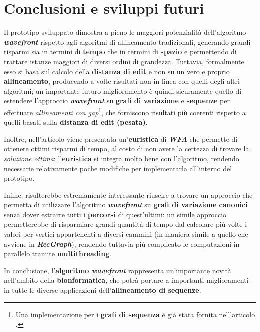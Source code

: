 \chapter{Conclusioni e sviluppi futuri}
    Il prototipo sviluppato dimostra a pieno le maggiori potenzialità dell'algoritmo \textbf{\textit{wavefront}} rispetto agli algoritmi di allineamento tradizionali, generando grandi risparmi sia in termini di \textbf{tempo} che in termini di \textbf{spazio} e permettendo di trattare istanze maggiori di diversi ordini di grandezza. Tuttavia, formalmente esso si basa sul calcolo della \textbf{distanza di edit} e non su un vero e proprio \textbf{allineamento}, producendo a volte risultati non in linea con quelli degli altri algoritmi; un importante futuro miglioramento è quindi sicuramente quello di estendere l'approccio \textbf{\textit{wavefront}} su \textbf{grafi di variazione} e \textbf{sequenze} per effettuare \emph{allineamenti con gap}\footnote{Una implementazione per i \textbf{grafi di sequenza} è già stata fornita nell'articolo \cite{wfa_gap_penalty}.}, che forniscono risultati più coerenti rispetto a quelli basati sulla \textbf{distanza di edit (pesata)}.   
    
    \vspace{10pt}
    Inoltre, nell'articolo \cite{wfa_sequence_graph} viene presentata un'\textbf{euristica} di \textbf{\textit{WFA}} che permette di ottenere ottimi risparmi di tempo, al costo di non avere la certezza di trovare la \emph{soluzione ottima}: l'\textbf{euristica} si integra molto bene con l'algoritmo, rendendo necessarie relativamente poche modifiche per implementarla all'interno del prototipo.
    
    \vspace{10pt}
    Infine, risulterebbe estremamente interessante riuscire a trovare un approccio che permetta di utilizzare l'algoritmo \textbf{\textit{wavefront}} su \textbf{grafi di variazione canonici} senza dover estrarre tutti i \textbf{percorsi} di quest'ultimi: un simile approccio permetterebbe di risparmiare grandi quantità di tempo dal calcolare più volte i valori per vertici appartenenti a diversi cammini (in maniera simile a quello che avviene in \textbf{\textit{RecGraph}}), rendendo tuttavia più complicato le computazioni in parallelo tramite \textbf{multithreading}.

    \vspace{10pt}
    In conclusione, l'\textbf{algoritmo \textit{wavefront}} rappresenta un'importante novità nell'ambito della \textbf{bionformatica}, che potrà portare a importanti miglioramenti in tutte le diverse applicazioni dell'\textbf{allineamento di sequenze}.  